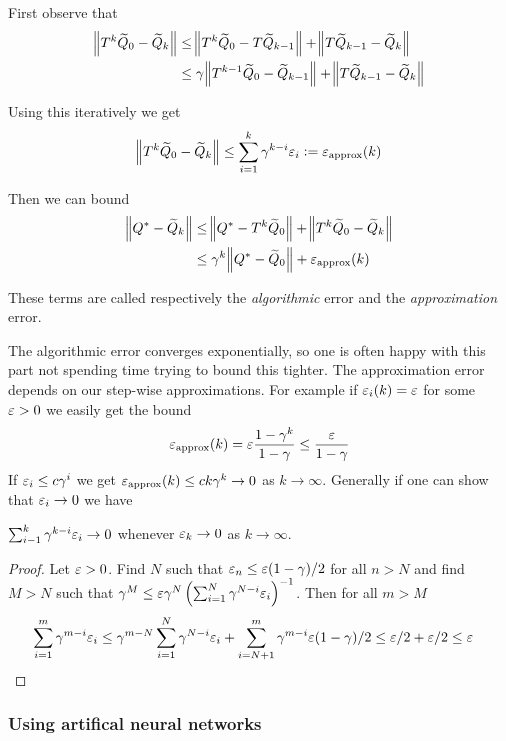 First observe that
\begin{align*}
  \norm{T^k \widetilde{Q}_0 - \widetilde{Q}_k}
  &\leq \norm{T^k \widetilde{Q}_0 - T \widetilde{Q}_{k-1}} + \norm{T\widetilde{Q}_{k-1} - \widetilde{Q}_k}
  \\ &\leq \gamma \norm{T^{k-1} \widetilde{Q}_0 - \widetilde{Q}_{k-1}}
  + \norm{T\widetilde{Q}_{k-1} - \widetilde{Q}_k}
\end{align*}

Using this iteratively we get
\[ \norm{T^k \widetilde{Q}_0 - \widetilde{Q}_k} \leq \sum_{i=1}^k \gamma^{k-i} \varepsilon_i
\vcentcolon= \varepsilon_{\mathrm{approx}}(k) \]

Then we can bound
\begin{align*}
  \norm{Q^* - \widetilde{Q}_k}
  &\leq \norm{Q^* - T^k \widetilde{Q}_0} + \norm{T^k \widetilde{Q}_0 - \widetilde{Q}_k}
  \\ &\leq \gamma^k \norm{Q^* - \widetilde{Q}_0}
  + \varepsilon_{\mathrm{approx}}(k)
\end{align*}

These terms are called respectively the \emph{algorithmic} error
and the \emph{approximation} error.

The algorithmic error converges exponentially, so one is often happy with this
part not spending time trying to bound this tighter.
The approximation error depends on our step-wise approximations. For example
if $\varepsilon_i(k) = \varepsilon$ for some $\varepsilon > 0$ we easily get the bound
\begin{equation}
  \varepsilon_{\mathrm{approx}}(k) = \varepsilon \frac{1-\gamma^k}{1-\gamma} \leq \frac{\varepsilon}{1-\gamma}
  \label{eq:approxEpsBound}
\end{equation}
If $\varepsilon_i \leq c\gamma^i$ we get $\varepsilon_{\mathrm{approx}}(k) \leq ck \gamma^k \to 0$ as
$k \to \infty$.
Generally if one can show that $\varepsilon_i \to 0$ we have
\begin{prop} $ \sum_{i-1}^k \gamma^{k-i} \varepsilon_i \to 0 $
  whenever $\varepsilon_k \to 0$ as $k \to \infty$.
\end{prop}
\begin{proof}
  Let $\varepsilon > 0$. Find $N$ such that $\varepsilon_n \leq \varepsilon (1-\gamma)/2$ 
  for all $n>N$ and find $M>N$ such that
  $\gamma^M \leq
  \varepsilon \gamma^N \left( \sum_{i=1}^N \gamma^{N-i} \varepsilon_i \right)^{-1}$.
  Then for all $m>M$
  \begin{align*}
    \sum_{i=1}^m \gamma^{m-i} \varepsilon_i
    &\leq \gamma^{m-N} \sum_{i=1}^N \gamma^{N-i} \varepsilon_i
    + \sum_{i=N+1}^m \gamma^{m-i} \varepsilon (1-\gamma)/2
    \leq \varepsilon/2 + \varepsilon/2 \leq \varepsilon
  \end{align*}
\end{proof}

\subsubsection{Using artifical neural networks}

